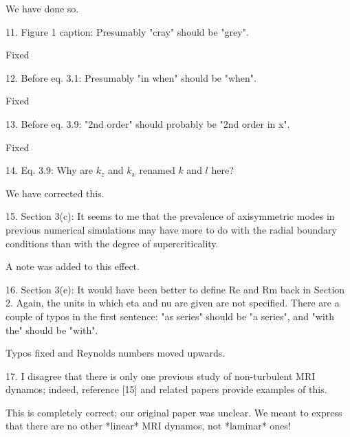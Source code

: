 \documentclass[letterpaper, 12pt]{article}
\newenvironment{review}{\vspace{1em}\begin{leftbar}}{\end{leftbar}}
\begin{document}
We have done so.

\begin{review}
11. Figure 1 caption: Presumably "cray" should be "grey".  
\end{review}


Fixed

\begin{review}
12. Before eq. 3.1: Presumably "in when" should be "when".  
\end{review}

Fixed


\begin{review}
13. Before eq. 3.9: "2nd order" should probably be "2nd order in x".  
\end{review}

Fixed


\begin{review}
14. Eq. 3.9: Why are $k_z$ and $k_x$ renamed $k$ and $l$ here?  
\end{review}

We have corrected this.


\begin{review}
15. Section 3(c): It seems to me that the prevalence of axisymmetric modes in previous numerical simulations may have more to do with the radial boundary conditions than with the degree of supercriticality.
\end{review}

A note was added to this effect.


\begin{review}
16. Section 3(e): It would have been better to define Re and Rm back in Section 2. Again, the units in which eta and nu are given are not specified. There are a couple of typos in the first sentence: "as series" should be "a series", and "with the" should be "with".
\end{review}

Typos fixed and Reynolds numbers moved upwards.


\begin{review}
17. I disagree that there is only one previous study of non-turbulent MRI dynamos; indeed, reference [15] and related papers provide examples of this.  
\end{review}

This is completely correct; our original paper was unclear. We meant to express that there are no other *linear* MRI dynamos, not *laminar* ones!
\end{document}
